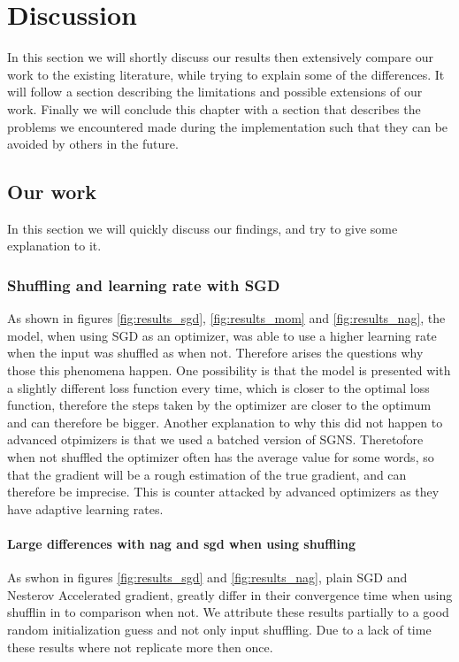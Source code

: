 \chapter{Discussion}\label{chap:discussion}



In this section we will shortly discuss our results then extensively compare our work to the existing literature, while trying to explain some of the differences. It will follow a section describing the limitations and possible extensions of our work. Finally we will conclude this chapter with a section that describes the problems we encountered made during the implementation such that they can be avoided by others in the future.

\section{Our work}
In this section we will quickly discuss our findings, and try to give some explanation to it.  
\subsection{Shuffling and learning rate with SGD}
As shown in figures \ref{fig:results_sgd}, \ref{fig:results_mom} and \ref{fig:results_nag}, the model, when using SGD as an optimizer,  was able to use a higher learning rate when the input was shuffled as when not. Therefore arises the questions why those this phenomena happen. One possibility is that the model is presented with a slightly different loss function every time, which is closer to the optimal loss function, therefore the steps taken by the optimizer are closer to the optimum and can therefore be bigger. Another explanation to why this did not happen to advanced otpimizers is that we used a batched version of SGNS. Theretofore when not shuffled the optimizer often has the average value for some words, so that the gradient will be a rough estimation of the true gradient, and can therefore be imprecise. This is counter attacked by advanced optimizers as they have adaptive learning rates.
\subsubsection{Large differences with nag and sgd when using shuffling}
As swhon in figures \ref{fig:results_sgd} and \ref{fig:results_nag}, plain SGD and Nesterov Accelerated gradient, greatly differ in their convergence time when using shufflin in to comparison when not. We attribute these results partially to a good random initialization guess and not only input shuffling. Due to a lack of time these results where not replicate more then once. 

